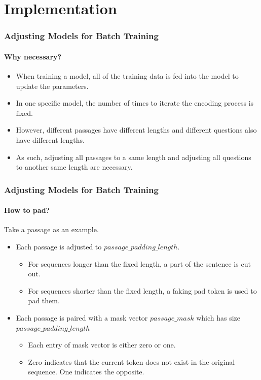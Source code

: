 \documentclass{beamer}
\begin{document}
\section{Implementation}

\begin{frame} \frametitle{Adjusting Models for Batch Training}\framesubtitle{Why necessary?}
    \begin{itemize}
        \item When training a model, all of the training data is fed into the model to update the parameters.
        \item In one specific model, the number of times to iterate the encoding process is fixed.
        \item However, different passages have different lengths and different questions also have different lengths.
        \item As such, adjusting all passages to a same length and adjusting all questions to another same length are necessary.
    \end{itemize}
\end{frame}

\begin{frame}\frametitle{Adjusting Models for Batch Training}\framesubtitle{How to pad?}
Take a passage as an example.
    \begin{itemize}
        \item Each passage is adjusted to $passage\_padding\_length$.
            \begin{itemize}
                \item For sequences longer than the fixed length, a part of the sentence is cut out.
                \item For sequences shorter than the fixed length, a faking pad token is used to pad them.
            \end{itemize}
        \item Each passage is paired with a mask vector $passage\_mask$ which has size $passage\_padding\_length$
            \begin{itemize}
                \item Each entry of mask vector is either zero or one. \item Zero indicates that the current token does not exist in the original sequence. One indicates the opposite.
            \end{itemize}
    \end{itemize}
\end{frame}
\end{document}
